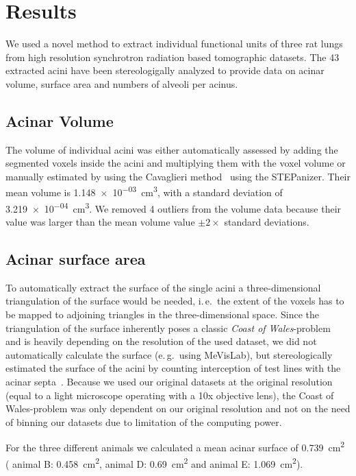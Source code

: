 \documentclass[a4paper,DIVcalc,abstract,english]{scrartcl}
\newcommand{\ie}{i.\,e.\ }
\newcommand{\eg}{e.\,g.\ }
\newcommand{\numberofacini}{43}
\newcommand{\numberofoutliers}{4} %
\newcommand{\biggerthan}{2} %
\newcommand{\meanacinarvolume}{1.148e-03} %
\newcommand{\std}{3.219e-04} %
\newcommand{\acinarsurfaceB}{0.458} %
\newcommand{\acinarsurfaceD}{0.69} %
\newcommand{\acinarsurfaceE}{1.069} %
\newcommand{\meanacinarsurface}{0.739} %
\begin{document}
\section{Results}
\label{sec:results}
We used a novel method to extract individual functional units of three rat lungs from high resolution synchrotron radiation based tomographic datasets.
The \numberofacini\xspace extracted acini have been stereologigally analyzed to provide data on acinar volume, surface area and numbers of alveoli per acinus.

\subsection{Acinar Volume}
The volume of individual acini was either automatically assessed by adding the segmented voxels inside the acini and multiplying them with the voxel volume or manually estimated by using the Cavaglieri method~\cite{Hsia2010} using the STEPanizer.
Their mean volume is \SI{\meanacinarvolume}{\centi\metre\cubed}, with a standard deviation of \SI{\std}{\centi\metre\cubed}. We removed \numberofoutliers\xspace outliers from the volume data because their value was larger than the mean volume value \(\pm\biggerthan\times\) standard deviations.

\subsection{Acinar surface area}
To automatically extract the surface of the single acini a three-dimensional triangulation of the surface would be needed, \ie the extent of the voxels has to be mapped to adjoining triangles in the three-dimensional space.
Since the triangulation of the surface inherently poses a classic \emph{Coast of Wales}-problem~\cite{Mandelbrot1967a} and is heavily depending on the resolution of the used dataset, we did not automatically calculate the surface (\eg using MeVisLab), but stereologically estimated the surface of the acini by counting interception of test lines with the acinar septa~\cite{Hsia2010}.
Because we used our original datasets at the original resolution (equal to a light microscope operating with a 10x objective lens), the Coast of Wales-problem was only dependent on our original resolution and not on the need of binning our datasets due to limitation of the computing power. 

For the three different animals we calculated a mean acinar surface of \SI{\meanacinarsurface}{\centi\metre\squared} (%
animal B: \SI{\acinarsurfaceB}{\centi\metre\squared},
animal D: \SI{\acinarsurfaceD}{\centi\metre\squared} and
animal E: \SI{\acinarsurfaceE}{\centi\metre\squared}).
\end{document}
